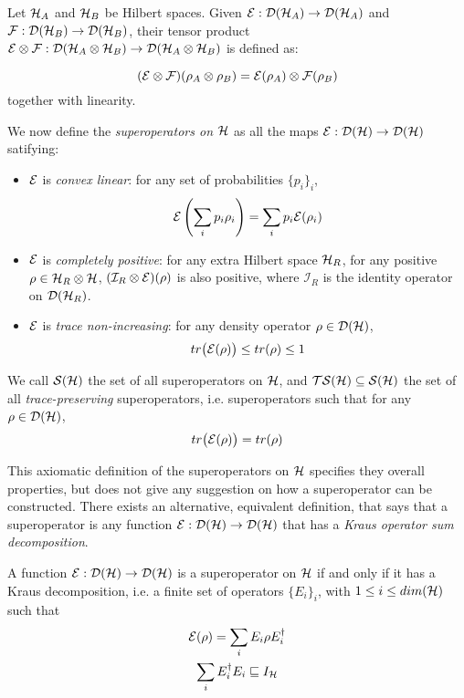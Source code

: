 Let $\mathcal{H}_A$ and $\mathcal{H}_B$ be Hilbert spaces. Given $\mathcal{E}: \mathcal{D}(\mathcal{H}_A) \rightarrow \mathcal{D}(\mathcal{H}_A)$ and $\mathcal{F}: \mathcal{D}(\mathcal{H}_B) \rightarrow \mathcal{D}(\mathcal{H}_B)$,  their tensor product $\mathcal{E}\otimes \mathcal{F}: \mathcal{D}(\mathcal{H}_A \otimes \mathcal{H}_B)\rightarrow \mathcal{D}(\mathcal{H}_A \otimes \mathcal{H}_B)$ is defined as:

\[
	(\mathcal{E} \otimes \mathcal{F})(\rho_A \otimes \rho_B) = \mathcal{E}(\rho_A)\otimes \mathcal{F}(\rho_B)
\]
together with linearity.


We now define the \textit{superoperators on $\mathcal{H}$} as all the maps $\mathcal{E}: \mathcal{D}(\mathcal{H}) \rightarrow \mathcal{D}(\mathcal{H})$ satifying:
\begin{itemize}
\item $\mathcal{E}$ is \textit{convex linear}: for any set of probabilities	$\{p_i\}_i$,
\[\mathcal{E}\left(\sum_i p_i \rho_i \right) = \sum_i p_i \mathcal{E}(\rho_i)\]
\item $\mathcal{E}$ is \textit{completely positive}: for any extra Hilbert space $\mathcal{H}_R$, for any positive $\rho \in \mathcal{H}_R \otimes \mathcal{H}$, $(\mathcal{I}_R\otimes \mathcal{E})(\rho)$ is also positive, where $\mathcal{I}_R$ is the identity operator on $\mathcal{D}(\mathcal{H}_R)$.
\item $\mathcal{E}$ is \textit{trace non-increasing}: for any density operator $\rho \in \mathcal{D}(\mathcal{H})$, 
\[tr\big(\mathcal{E}(\rho)\big) \leq tr(\rho) \leq 1\]
\end{itemize}
We call $\mathcal{S}(\mathcal{H})$ the set of all superoperators on $\mathcal{H}$, and $\mathcal{TS}(\mathcal{H}) \subseteq \mathcal{S}(\mathcal{H})$ the set of all \textit{trace-preserving} superoperators, i.e. superoperators such that for any $\rho \in \mathcal{D}(\mathcal{H})$, 
\[tr\big(\mathcal{E}(\rho)\big) = tr(\rho)\] 



This axiomatic definition of the superoperators on $\mathcal{H}$ specifies they overall properties, but does not give any suggestion on how a superoperator can be constructed. There exists an alternative, equivalent definition, that says that a superoperator is any function $\mathcal{E}: \mathcal{D}(\mathcal{H}) \rightarrow \mathcal{D}(\mathcal{H})$ that has a \textit{Kraus operator sum decomposition}.

A function $\mathcal{E}: \mathcal{D}(\mathcal{H}) \rightarrow \mathcal{D}(\mathcal{H})$ is a superoperator on $\mathcal{H}$ if and only if it has a Kraus decomposition, i.e. a finite set of operators $\{E_i\}_i$, with $1 \leq i \leq dim(\mathcal{H})$ such that
\begin{gather*}
\mathcal{E}(\rho) = \sum_i E_i\rho E_i^\dagger \\
\sum_i E_i^\dagger E_i \sqsubseteq I_{\mathcal{H}}
\end{gather*}

